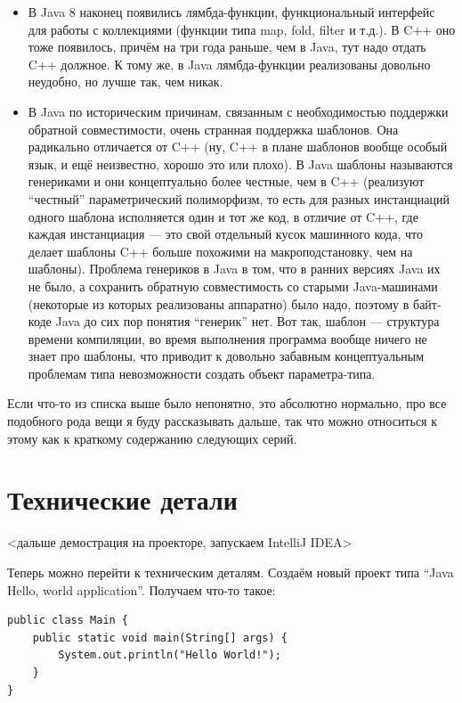 \documentclass[a5paper]{article}
\begin{document}
\begin{itemize}
	\item В Java 8 наконец появились лямбда-функции, функциональный интерфейс для работы с коллекциями (функции типа map, fold, filter и т.д.). В C++ оно тоже появилось, причём на три года раньше, чем в Java, тут надо отдать C++ должное. К тому же, в Java лямбда-функции реализованы довольно неудобно, но лучше так, чем никак.
	\item В Java по историческим причинам, связанным с необходимостью поддержки обратной совместимости, очень странная поддержка шаблонов. Она радикально отличается от C++ (ну, C++ в плане шаблонов вообще особый язык, и ещё неизвестно, хорошо это или плохо). В Java шаблоны называются генериками и они концептуально более честные, чем в C++ (реализуют ``честный'' параметрический полиморфизм, то есть для разных инстанциаций одного шаблона исполняется один и тот же код, в отличие от C++, где каждая инстанциация --- это свой отдельный кусок машинного кода, что делает шаблоны C++ больше похожими на макроподстановку, чем на шаблоны). Проблема генериков в Java в том, что в ранних версиях Java их не было, а сохранить обратную совместимость со старыми Java-машинами (некоторые из которых реализованы аппаратно) было надо, поэтому в байт-коде Java до сих пор понятия ``генерик'' нет. Вот так, шаблон --- структура времени компиляции, во время выполнения программа вообще ничего не знает про шаблоны, что приводит к довольно забавным концептуальным проблемам типа невозможности создать объект параметра-типа.
\end{itemize}

Если что-то из списка выше было непонятно, это абсолютно нормально, про все подобного рода вещи я буду рассказывать дальше, так что можно относиться к этому как к краткому содержанию следующих серий.

\section{Технические детали}

<дальше демострация на проекторе, запускаем IntelliJ IDEA>

Теперь можно перейти к техническим деталям. Создаём новый проект типа ``Java Hello, world application''. Получаем что-то такое:

\begin{verbatim}
public class Main {
    public static void main(String[] args) {
        System.out.println("Hello World!");
    }
}
\end{verbatim}
\end{document}
